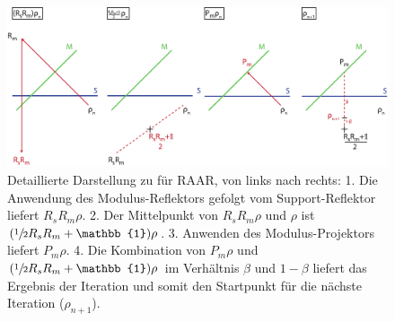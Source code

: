 \begin{figure}
	\centering
	\includegraphics[width=1\textwidth]{images/raar.pdf}
	\caption[RAAR]{Detaillierte Darstellung zu  für RAAR, von links nach rechts: 1. Die Anwendung des Modulus-Reflektors gefolgt vom Support-Reflektor liefert $R_sR_m\rho$. 2. Der Mittelpunkt von $R_sR_m\rho$ und $\rho$ ist $(\sfrac{1}{2}R_sR_m+\mathbb{1})\rho$. 3. Anwenden des Modulus-Projektors liefert $P_m\rho$. 4. Die Kombination von $P_m\rho$ und $(\sfrac{1}{2}R_sR_m+\mathbb{1})\rho$ im Verhältnis $\beta$ und $1-\beta$ liefert das Ergebnis der Iteration  und somit den Startpunkt für die nächste Iteration ($\rho_{n+1}$).}
	\label{fig:raar}
\end{figure} 	
